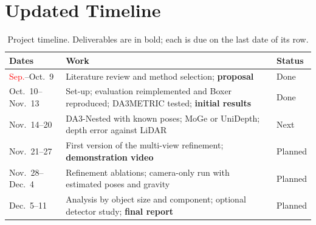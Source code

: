 \documentclass[conference]{IEEEtran}
\newcommand{\tbd}[1]{\textcolor{red}{#1}}
\begin{document}
\section{Updated Timeline}
\begin{table}[h]
\caption{Project timeline. Deliverables are in bold; each is due on the last date of its row.}
\label{tab:timeline}
\centering
\renewcommand{\arraystretch}{1.15}
\setlength{\tabcolsep}{3pt}
\begin{tabularx}{\columnwidth}{@{}l>{\raggedright\arraybackslash}Xl@{}}
\toprule
Dates & Work & Status \\
\midrule
\tbd{Sep.}--Oct.~9 & Literature review and method selection; \textbf{proposal} & Done \\
Oct.~10--Nov.~13 & Set-up; evaluation reimplemented and Boxer reproduced; DA3METRIC tested; \textbf{initial results} & Done \\
Nov.~14--20      & DA3-Nested with known poses; MoGe or UniDepth; depth error against LiDAR & Next \\
Nov.~21--27      & First version of the multi-view refinement; \textbf{demonstration video} & Planned \\
Nov.~28--Dec.~4  & Refinement ablations; camera-only run with estimated poses and gravity & Planned \\
Dec.~5--11       & Analysis by object size and component; optional detector study; \textbf{final report} & Planned \\
\bottomrule
\end{tabularx}
\end{table}
\end{document}
